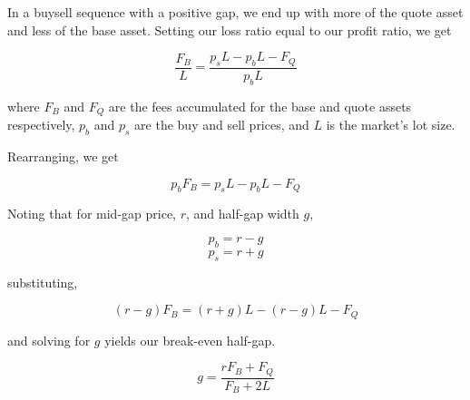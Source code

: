\documentclass[]{article}
\begin{document}
In a buy\textrightarrow sell sequence with a positive gap, we end up with more of the quote asset and less of the base asset. Setting our loss ratio equal to our profit ratio, we get

\[
\frac{F_B}{L} = \frac{p_sL - p_bL - F_Q}{p_bL}
\]

where $ F_B $ and $ F_Q $ are the fees accumulated for the base and quote assets respectively, $ p_b $ and $ p_s $ are the buy and sell prices, and $ L $ is the market's lot size.

Rearranging, we get 

\[
p_bF_B = p_sL - p_bL - F_Q
\]

Noting that for mid-gap price, $ r $, and half-gap width  $ g $, 

\[
p_b = r - g
\]
\[
p_s = r + g
\]

substituting,

\[
(r - g)F_B = (r + g)L - (r - g)L - F_Q
\]

and solving for $ g $ yields our break-even half-gap.


\[
g = \frac{rF_B + F_Q}{F_B + 2L}
\]
\end{document}
